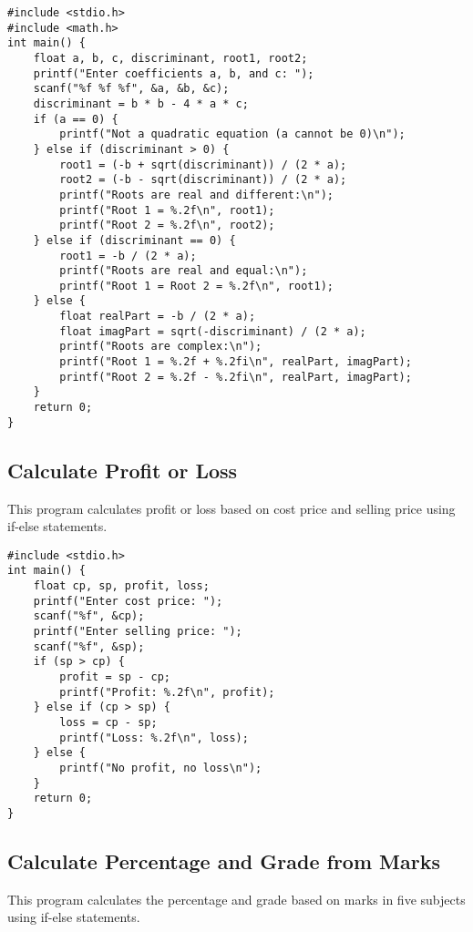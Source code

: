 \documentclass[a4paper,12pt]{article}
\begin{document}
\begin{lstlisting}[caption={Find All Roots of a Quadratic Equation}]
#include <stdio.h>
#include <math.h>
int main() {
    float a, b, c, discriminant, root1, root2;
    printf("Enter coefficients a, b, and c: ");
    scanf("%f %f %f", &a, &b, &c);
    discriminant = b * b - 4 * a * c;
    if (a == 0) {
        printf("Not a quadratic equation (a cannot be 0)\n");
    } else if (discriminant > 0) {
        root1 = (-b + sqrt(discriminant)) / (2 * a);
        root2 = (-b - sqrt(discriminant)) / (2 * a);
        printf("Roots are real and different:\n");
        printf("Root 1 = %.2f\n", root1);
        printf("Root 2 = %.2f\n", root2);
    } else if (discriminant == 0) {
        root1 = -b / (2 * a);
        printf("Roots are real and equal:\n");
        printf("Root 1 = Root 2 = %.2f\n", root1);
    } else {
        float realPart = -b / (2 * a);
        float imagPart = sqrt(-discriminant) / (2 * a);
        printf("Roots are complex:\n");
        printf("Root 1 = %.2f + %.2fi\n", realPart, imagPart);
        printf("Root 2 = %.2f - %.2fi\n", realPart, imagPart);
    }
    return 0;
}
\end{lstlisting}

\newpage

\subsection{Calculate Profit or Loss}
This program calculates profit or loss based on cost price and selling price using if-else statements.

\begin{lstlisting}[caption={Calculate Profit or Loss}]
#include <stdio.h>
int main() {
    float cp, sp, profit, loss;
    printf("Enter cost price: ");
    scanf("%f", &cp);
    printf("Enter selling price: ");
    scanf("%f", &sp);
    if (sp > cp) {
        profit = sp - cp;
        printf("Profit: %.2f\n", profit);
    } else if (cp > sp) {
        loss = cp - sp;
        printf("Loss: %.2f\n", loss);
    } else {
        printf("No profit, no loss\n");
    }
    return 0;
}
\end{lstlisting}

\newpage

\subsection{Calculate Percentage and Grade from Marks}
This program calculates the percentage and grade based on marks in five subjects using if-else statements.
\end{document}
